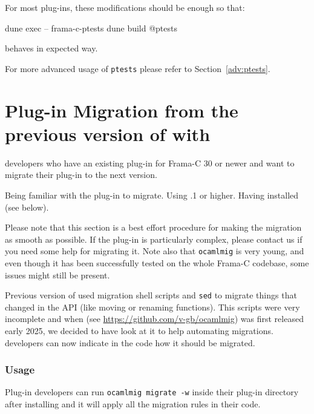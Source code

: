 For most plug-ins, these modifications should be enough so that:
\begin{logs}
dune exec -- frama-c-ptests
dune build @ptests
\end{logs}
behaves in expected way.

For more advanced usage of \texttt{ptests} please refer to Section~\ref{adv:ptests}.


\section{Plug-in Migration from the previous version of \framac with \ocamlmig }\label{adv:framac-migration}

\begin{target}developers who have an existing plug-in for Frama-C 30 or newer
  and want to migrate their plug-in to the next version.
\end{target}

\begin{prereq}
  Being familiar with the plug-in to migrate. Using .1 or higher.
  Having installed \ocamlmig (see below).
\end{prereq}

\begin{important}
  Please note that this section is a best effort procedure for making the
  migration as smooth as possible. If the plug-in is particularly complex,
  please contact us if you need some help for migrating it. Note also that
  \texttt{ocamlmig} is very young, and even though it has been successfully
  tested on the whole Frama-C codebase, some issues might still be present.
\end{important}

Previous version of \framac used migration shell scripts and \texttt{sed} to
migrate things that changed in the API (like moving or renaming functions). This
scripts were very incomplete and when \ocamlmig (see
\url{https://github.com/v-gb/ocamlmig}) was first released early 2025, we
decided to have look at it to help automating migrations. \framac developers can
now indicate in the code how it should be migrated.

\subsubsection{Usage}

Plug-in developers can run \lstinline{ocamlmig migrate -w} inside their plug-in
directory after installing \framac and it will apply all the migration rules in
their code.

